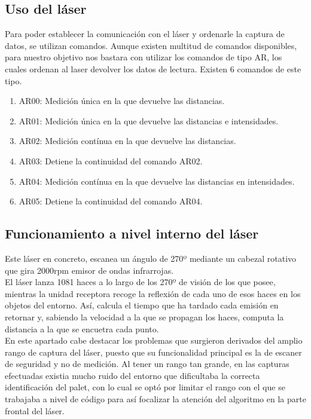 \subsection{Uso del láser}
Para poder establecer la comunicación con el láser y ordenarle la captura de datos, se utilizan comandos. Aunque existen multitud de comandos disponibles, para nuestro objetivo nos bastara con utilizar los comandos de tipo AR, los cuales ordenan al laser devolver los datos de lectura.
Existen 6 comandos de este tipo.
\begin{enumerate}
	\item AR00: Medición única en la que devuelve las distancias.
	\item AR01: Medición única en la que devuelve las distancias e intensidades.
	\item AR02: Medición contínua en la que devuelve las distancias.
	\item AR03: Detiene la continuidad del comando AR02.
	\item AR04: Medición contínua en la que devuelve las distancias en intensidades.
	\item AR05: Detiene la continuidad del comando AR04.
\end{enumerate}

\subsection{Funcionamiento a nivel interno del láser}
				Este láser en concreto, escanea un ángulo de 270º mediante un cabezal rotativo que gira 2000rpm emisor de ondas infrarrojas.%
\\ El láser lanza 1081 haces  a lo largo de los 270º de visión de los que posee, mientras la unidad receptora recoge la reflexión de cada uno de esos haces en los objetos del entorno. Así, calcula el tiempo que ha tardado cada emisión en retornar y, sabiendo la velocidad a la que se propagan los haces, computa la distancia a la que se encuetra cada punto.\\
En este apartado cabe destacar los problemas que surgieron derivados del amplio rango de captura del láser, puesto que su funcionalidad principal es la de escaner de seguridad y no de medición. Al tener un rango tan grande, en las capturas efectuadas existia mucho ruido del entorno que dificultaba la correcta identificación del palet, con lo cual se optó por limitar el rango con el que se trabajaba a nivel de código para así focalizar la atención del algoritmo en la parte frontal del láser.\\
			



